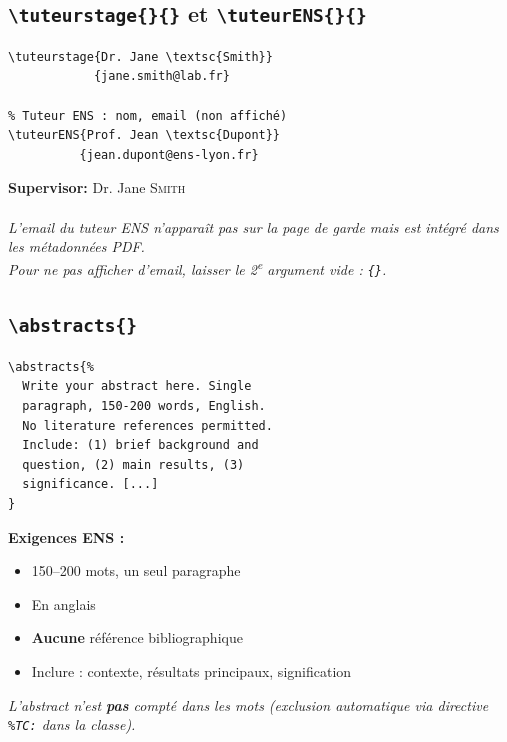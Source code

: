 \documentclass[12pt, a4paper]{article}
\begin{document}
\subsection[\texttt{\textbackslash tuteurstage} et \texttt{\textbackslash tuteurENS}]{\texttt{\textbackslash tuteurstage\{\}\{\}} et \texttt{\textbackslash tuteurENS\{\}\{\}}}

\begin{demo}
\begin{lstlisting}[style=latexcode]
% Encadrant de stage : nom, email
\tuteurstage{Dr. Jane \textsc{Smith}}
            {jane.smith@lab.fr}

% Tuteur ENS : nom, email (non affiché)
\tuteurENS{Prof. Jean \textsc{Dupont}}
          {jean.dupont@ens-lyon.fr}
\end{lstlisting}
\tcblower
\small\textbf{Supervisor:} Dr. Jane \textsc{Smith}\\
\hspace*{1.5em}{\ttfamily jane.smith@lab.fr}\\[6pt]
{\footnotesize\itshape L'email du tuteur ENS n'apparaît pas sur la page de garde mais est intégré dans les métadonnées PDF.\\ 
Pour ne pas afficher d'email, laisser le 2\textsuperscript{e} argument vide : \texttt{\{\}}.}
\end{demo}

\newpage

\subsection{\texttt{\textbackslash abstracts\{\}}}

\begin{demo}
\begin{lstlisting}[style=latexcode]
\abstracts{%
  Write your abstract here. Single
  paragraph, 150-200 words, English.
  No literature references permitted.
  Include: (1) brief background and
  question, (2) main results, (3)
  significance. [...]
}
\end{lstlisting}
\tcblower
{\footnotesize\textbf{Exigences ENS :}
\begin{itemize}[noitemsep, topsep=2pt]
  \item 150–200 mots, un seul paragraphe
  \item En anglais
  \item \textbf{Aucune} référence bibliographique
  \item Inclure : contexte, résultats principaux, signification
\end{itemize}
\medskip
\textit{L'abstract n'est \textbf{pas} compté dans les mots (exclusion automatique via directive \texttt{\%TC:} dans la classe).}}
\end{demo}
\end{document}
